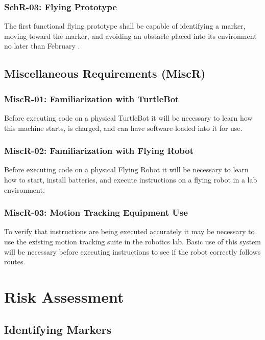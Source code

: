 \documentclass{article}
\begin{document}
		\subsubsection{SchR-03: Flying Prototype}
		
		The first functional flying prototype shall be capable of identifying a marker, moving toward the marker, and avoiding an obstacle placed into its environment no later than February  .
		
	\subsection{Miscellaneous Requirements (MiscR)}
	
		\subsubsection{MiscR-01: Familiarization with TurtleBot}
		
		Before executing code on a physical TurtleBot it will be necessary to learn how this machine starts, is charged, and can have software loaded into it for use.
		
		\subsubsection{MiscR-02: Familiarization with Flying Robot}
		
		Before executing code on a physical Flying Robot it will be necessary to learn how to start, install batteries, and execute instructions on a flying robot in a lab environment.
		
		\subsubsection{MiscR-03: Motion Tracking Equipment Use}
		
		To verify that instructions are being executed accurately it may be necessary to use the existing motion tracking suite in the robotics lab. Basic use of this system will be necessary before executing instructions to see if the robot correctly follows routes.

\section{Risk Assessment}

	\subsection{Identifying Markers}
	
\end{document}
